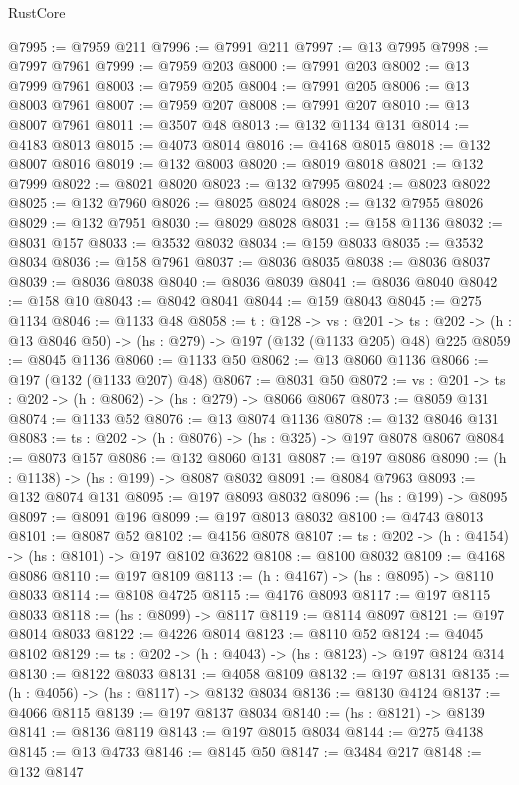 \begin{lexlean}{RustCore}
\begin{coremodule}
@7995 := @7959 @211
@7996 := @7991 @211
@7997 := @13 @7995
@7998 := @7997 @7961
@7999 := @7959 @203
@8000 := @7991 @203
@8002 := @13 @7999 @7961
@8003 := @7959 @205
@8004 := @7991 @205
@8006 := @13 @8003 @7961
@8007 := @7959 @207
@8008 := @7991 @207
@8010 := @13 @8007 @7961
@8011 := @3507 @48
@8013 := @132 @1134 @131
@8014 := @4183 @8013
@8015 := @4073 @8014
@8016 := @4168 @8015
@8018 := @132 @8007 @8016
@8019 := @132 @8003
@8020 := @8019 @8018
@8021 := @132 @7999
@8022 := @8021 @8020
@8023 := @132 @7995
@8024 := @8023 @8022
@8025 := @132 @7960
@8026 := @8025 @8024
@8028 := @132 @7955 @8026
@8029 := @132 @7951
@8030 := @8029 @8028
@8031 := @158 @1136
@8032 := @8031 @157
@8033 := @3532 @8032
@8034 := @159 @8033
@8035 := @3532 @8034
@8036 := @158 @7961
@8037 := @8036 @8035
@8038 := @8036 @8037
@8039 := @8036 @8038
@8040 := @8036 @8039
@8041 := @8036 @8040
@8042 := @158 @10
@8043 := @8042 @8041
@8044 := @159 @8043
@8045 := @275 @1134
@8046 := @1133 @48
@8058 := {t : @128} ->
  {vs : @201} ->
  {ts : @202} -> (h : @13 @8046 @50) -> (hs : @279) -> @197 (@132 (@1133 @205) @48) @225
@8059 := @8045 @1136
@8060 := @1133 @50
@8062 := @13 @8060 @1136
@8066 := @197 (@132 (@1133 @207) @48)
@8067 := @8031 @50
@8072 := {vs : @201} -> {ts : @202} -> (h : @8062) -> (hs : @279) -> @8066 @8067
@8073 := @8059 @131
@8074 := @1133 @52
@8076 := @13 @8074 @1136
@8078 := @132 @8046 @131
@8083 := {ts : @202} -> (h : @8076) -> (hs : @325) -> @197 @8078 @8067
@8084 := @8073 @157
@8086 := @132 @8060 @131
@8087 := @197 @8086
@8090 := (h : @1138) -> (hs : @199) -> @8087 @8032
@8091 := @8084 @7963
@8093 := @132 @8074 @131
@8095 := @197 @8093 @8032
@8096 := (hs : @199) -> @8095
@8097 := @8091 @196
@8099 := @197 @8013 @8032
@8100 := @4743 @8013
@8101 := @8087 @52
@8102 := @4156 @8078
@8107 := {ts : @202} -> (h : @4154) -> (hs : @8101) -> @197 @8102 @3622
@8108 := @8100 @8032
@8109 := @4168 @8086
@8110 := @197 @8109
@8113 := (h : @4167) -> (hs : @8095) -> @8110 @8033
@8114 := @8108 @4725
@8115 := @4176 @8093
@8117 := @197 @8115 @8033
@8118 := (hs : @8099) -> @8117
@8119 := @8114 @8097
@8121 := @197 @8014 @8033
@8122 := @4226 @8014
@8123 := @8110 @52
@8124 := @4045 @8102
@8129 := {ts : @202} -> (h : @4043) -> (hs : @8123) -> @197 @8124 @314
@8130 := @8122 @8033
@8131 := @4058 @8109
@8132 := @197 @8131
@8135 := (h : @4056) -> (hs : @8117) -> @8132 @8034
@8136 := @8130 @4124
@8137 := @4066 @8115
@8139 := @197 @8137 @8034
@8140 := (hs : @8121) -> @8139
@8141 := @8136 @8119
@8143 := @197 @8015 @8034
@8144 := @275 @4138
@8145 := @13 @4733
@8146 := @8145 @50
@8147 := @3484 @217
@8148 := @132 @8147

\end{coremodule}
\end{lexlean}
